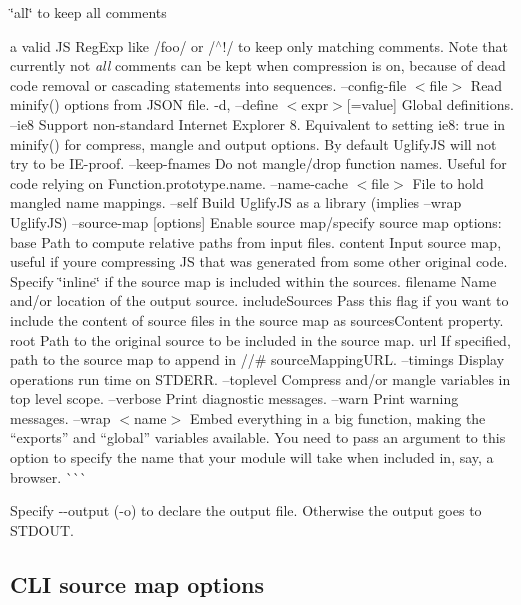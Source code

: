 \begin{DoxyItemize}
\item \char`\"{}all\char`\"{} to keep all comments
\item a valid JS Reg\+Exp like {\ttfamily /foo/} or {\ttfamily /$^\wedge$!/} to keep only matching comments. Note that currently not {\itshape all} comments can be kept when compression is on, because of dead code removal or cascading statements into sequences. --config-\/file $<$file$>$ Read {\ttfamily minify()} options from J\+S\+ON file. -\/d, --define $<$expr$>$\mbox{[}=value\mbox{]} Global definitions. --ie8 Support non-\/standard Internet Explorer 8. Equivalent to setting {\ttfamily ie8\+: true} in {\ttfamily minify()} for {\ttfamily compress}, {\ttfamily mangle} and {\ttfamily output} options. By default Uglify\+JS will not try to be I\+E-\/proof. --keep-\/fnames Do not mangle/drop function names. Useful for code relying on Function.\+prototype.\+name. --name-\/cache $<$file$>$ File to hold mangled name mappings. --self Build Uglify\+JS as a library (implies --wrap Uglify\+JS) --source-\/map \mbox{[}options\mbox{]} Enable source map/specify source map options\+: {\ttfamily base} Path to compute relative paths from input files. {\ttfamily content} Input source map, useful if you\textquotesingle{}re compressing JS that was generated from some other original code. Specify \char`\"{}inline\char`\"{} if the source map is included within the sources. {\ttfamily filename} Name and/or location of the output source. {\ttfamily include\+Sources} Pass this flag if you want to include the content of source files in the source map as sources\+Content property. {\ttfamily root} Path to the original source to be included in the source map. {\ttfamily url} If specified, path to the source map to append in {\ttfamily //\# source\+Mapping\+U\+RL}. --timings Display operations run time on S\+T\+D\+E\+RR. --toplevel Compress and/or mangle variables in top level scope. --verbose Print diagnostic messages. --warn Print warning messages. --wrap $<$name$>$ Embed everything in a big function, making the “exports” and “global” variables available. You need to pass an argument to this option to specify the name that your module will take when included in, say, a browser. \`{}\`{}\`{}
\end{DoxyItemize}

Specify {\ttfamily -\/-\/output} ({\ttfamily -\/o}) to declare the output file. Otherwise the output goes to S\+T\+D\+O\+UT.

\subsection*{C\+LI source map options}

